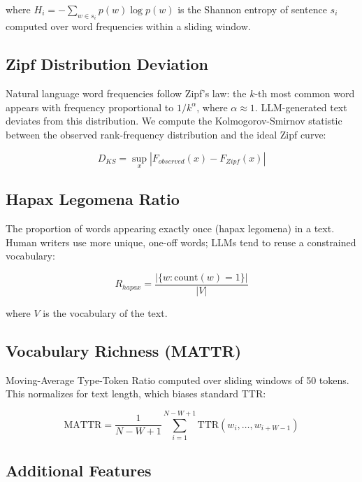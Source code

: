 \documentclass[11pt]{article}
\begin{document}
where $H_i = -\sum_{w \in s_i} p(w) \log p(w)$ is the Shannon entropy of sentence $s_i$ computed over word frequencies within a sliding window.

\subsection{Zipf Distribution Deviation}

Natural language word frequencies follow Zipf's law: the $k$-th most common word appears with frequency proportional to $1/k^\alpha$, where $\alpha \approx 1$. LLM-generated text deviates from this distribution. We compute the Kolmogorov-Smirnov statistic between the observed rank-frequency distribution and the ideal Zipf curve:

\begin{equation}
    D_{KS} = \sup_x |F_{observed}(x) - F_{Zipf}(x)|
\end{equation}

\subsection{Hapax Legomena Ratio}

The proportion of words appearing exactly once (hapax legomena) in a text. Human writers use more unique, one-off words; LLMs tend to reuse a constrained vocabulary:

\begin{equation}
    R_{hapax} = \frac{|\{w : \text{count}(w) = 1\}|}{|V|}
\end{equation}

where $V$ is the vocabulary of the text.

\subsection{Vocabulary Richness (MATTR)}

Moving-Average Type-Token Ratio computed over sliding windows of 50 tokens. This normalizes for text length, which biases standard TTR:

\begin{equation}
    \text{MATTR} = \frac{1}{N-W+1} \sum_{i=1}^{N-W+1} \text{TTR}(w_i, \ldots, w_{i+W-1})
\end{equation}

\subsection{Additional Features}
\end{document}
